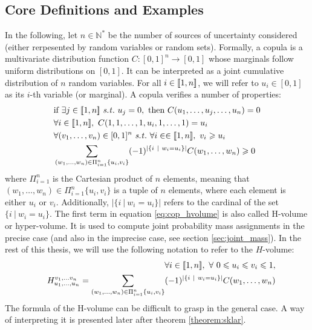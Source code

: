 \subsection{Core Definitions and Examples}\label{sec:copula_def}
In the following, let $n\in\mathbb{N}^*$ be the number of sources of uncertainty considered (either rerpesented by random variables or random sets). Formally, a copula is a multivariate distribution function $C:[0,1]^{n}\rightarrow [0,1]$ whose marginals follow uniform distributions on $[0,1]$. It can be interpreted as a joint cumulative distribution of $n$ random variables. For all $i\in{[\![} 1,n{]\!]} $, we will refer to $u_i\in[0,1]$ as its $i$-th variable (or marginal). A copula verifies a number of properties:
\begin{align}
    &\text{if }\exists j\in\opi 1,n\cli  \text{ \st }~u_j=0, \text{ then }C(u_1,\dots,u_j,\dots,u_n)=0\label{eq:zero_copula}\\
    &\forall i\in\opi 1,n\cli ,~C(1,1,\dots,1,u_i,1,\dots,1)=u_i\label{eq:copula_ones}\\
    &\forall (v_1,\dots,v_n)\in[0,1]^n \text{ \st }~\forall i\in\in\opi 1,n\cli ,~v_i\geqslant u_i\nonumber\\
    &\sum_{(w_1, \dots, w_n)\in\Pi_{i=1}^n\{u_i, v_i\}}(-1)^{|\{i~|~w_i=u_i\}|}C(w_1, \dots, w_n)\geqslant 0\label{eq:cop_hvolume}
\end{align}
where $\Pi_{i=1}^n$ is the Cartesian product of $n$ elements, meaning that $(w_1, \dots, w_n)\in\Pi_{i=1}^n\{u_i, v_i\}$ is a tuple of $n$ elements, where each element is either $u_i$ or $v_i$. Additionally, $|\{i~|~w_i=u_i\}|$ refers to the cardinal of the set $\{i~|~w_i=u_i\}$. The first term in equation \eqref{eq:cop_hvolume} is also called H-volume or hyper-volume. It is used to compute joint probability mass assignments in the precise case (and also in the imprecise case, see section \ref{sec:joint_mass}). In the rest of this thesis, we will use the following notation to refer to the $H$-volume:
\begin{eqnarray}\label{eq:hvolume}
    &&\forall i\in{[\![} 1,n{]\!]} ,~\forall~0\leqslant u_i \leqslant v_i \leqslant 1,\nonumber\\
    &&H^{v_1,\dots v_n}_{u_1,\dots,u_n}=\sum_{(w_1, \dots, w_n)\in\Pi_{i=1}^n\{u_i, v_i\}}(-1)^{|\{i~|~w_i=u_i\}|}C(w_1, \dots, w_n)
\end{eqnarray}
The formula of the H-volume can be difficult to grasp in the general case. A way of interpreting it is presented later after theorem \ref{theorem:sklar}.

